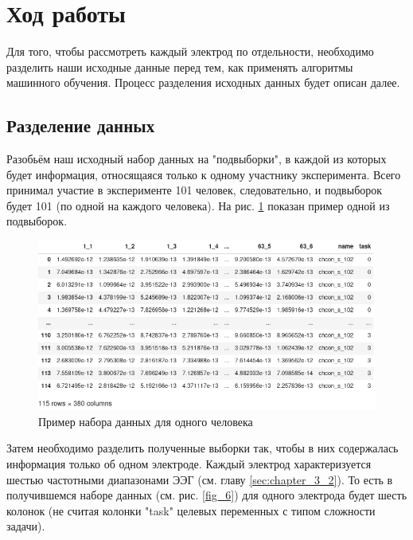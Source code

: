 \newpage

\section{Ход работы}

Для того, чтобы рассмотреть каждый электрод по отдельности, необходимо разделить наши
исходные данные перед тем, как применять алгоритмы машинного обучения. Процесс разделения
исходных данных будет описан далее.

\subsection{Разделение данных}
\label{sec:chapter_5_1}

Разобьём наш исходный набор данных на "подвыборки", в каждой из которых будет информация,
относящаяся только к одному участнику эксперимента. Всего принимал участие в эксперименте
101 человек, следовательно, и подвыборок будет 101 (по одной на каждого человека). 
На рис. \ref{fig_5} показан пример одной из подвыборок.

\begin{figure}[H]
    \centering
    \includegraphics[width=\linewidth]{images/5.png}
    \caption{Пример набора данных для одного человека}
    \label{fig_5}
\end{figure}

Затем необходимо разделить полученные выборки так, чтобы в них содержалась информация
только об одном электроде. Каждый электрод характеризуется шестью частотными диапазонами
ЭЭГ (см. главу \ref{sec:chapter_3_2}). То есть в получившемся наборе данных (см. рис. \ref{fig_6}) для одного электрода будет шесть колонок
(не считая колонки "task" целевых переменных с типом сложности задачи).

